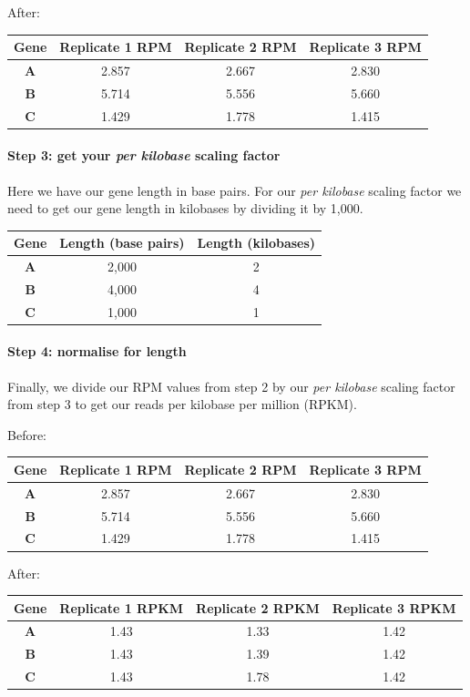 \documentclass[11pt]{article}
\begin{document}
\newpage

After:

\begin{longtable}[]{@{}cccc@{}}
\toprule
Gene & Replicate 1 RPM & Replicate 2 RPM & Replicate 3
RPM\tabularnewline
\midrule
\endhead
\textbf{A} & 2.857 & 2.667 & 2.830\tabularnewline
\textbf{B} & 5.714 & 5.556 & 5.660\tabularnewline
\textbf{C} & 1.429 & 1.778 & 1.415\tabularnewline
\bottomrule
\end{longtable}

\hypertarget{step-3-get-your-per-kilobase-scaling-factor}{%
\paragraph{\texorpdfstring{Step 3: get your \textit{per kilobase} scaling
factor}{Step 3: get your per kilobase scaling factor}}\label{step-3-get-your-per-kilobase-scaling-factor}}

Here we have our gene length in base pairs. For our \textit{per kilobase}
scaling factor we need to get our gene length in kilobases by dividing
it by 1,000.

\begin{longtable}[]{@{}ccc@{}}
\toprule
Gene & Length (base pairs) & Length (kilobases)\tabularnewline
\midrule
\endhead
\textbf{A} & 2,000 & 2\tabularnewline
\textbf{B} & 4,000 & 4\tabularnewline
\textbf{C} & 1,000 & 1\tabularnewline
\bottomrule
\end{longtable}

\hypertarget{step-4-normalise-for-length}{%
\paragraph{Step 4: normalise for
length}\label{step-4-normalise-for-length}}

Finally, we divide our RPM values from step 2 by our \textit{per kilobase}
scaling factor from step 3 to get our reads per kilobase per million
(RPKM).

Before:

\begin{longtable}[]{@{}cccc@{}}
\toprule
Gene & Replicate 1 RPM & Replicate 2 RPM & Replicate 3
RPM\tabularnewline
\midrule
\endhead
\textbf{A} & 2.857 & 2.667 & 2.830\tabularnewline
\textbf{B} & 5.714 & 5.556 & 5.660\tabularnewline
\textbf{C} & 1.429 & 1.778 & 1.415\tabularnewline
\bottomrule
\end{longtable}

After:

\begin{longtable}[]{@{}cccc@{}}
\toprule
Gene & Replicate 1 RPKM & Replicate 2 RPKM & Replicate 3
RPKM\tabularnewline
\midrule
\endhead
\textbf{A} & 1.43 & 1.33 & 1.42\tabularnewline
\textbf{B} & 1.43 & 1.39 & 1.42\tabularnewline
\textbf{C} & 1.43 & 1.78 & 1.42\tabularnewline
\bottomrule
\end{longtable}
\end{document}
